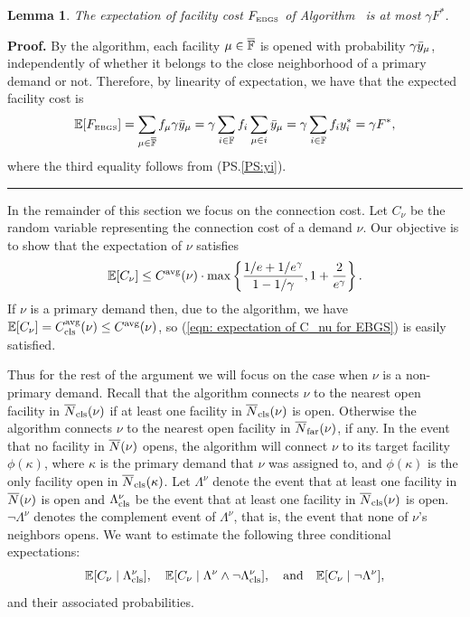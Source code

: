 \documentclass[oneside,final]{ucr}
\newtheorem{lemma}[theorem]{Lemma}
\newenvironment{proof}[1][Proof]{\textbf{#1.} }{\ \rule{0.5em}{0.5em}}
\begin{document}
\begin{lemma} \label{lem: EBGS facility cost}
The expectation of facility cost $F_{\mbox{\tiny\rm EBGS}}$ of Algorithm~{\EBGS} is at most $\gamma F^\ast$.
\end{lemma}
\begin{proof}
By the algorithm, each facility $\mu\in \overline{\mathbb{F}}$ is opened with
probability $\gamma {\bar y}_{\mu}$, independently of whether it belongs to the
close neighborhood of a primary demand or not. Therefore, by
  linearity of expectation, we have that the expected facility cost is
%
\begin{equation*}
	\mathbb{E}[F_{\mbox{\tiny\rm EBGS}}] = \sum_{\mu \in \overline{\mathbb{F}}} f_\mu \gamma {\bar y}_{\mu} 
			= \gamma \sum_{i\in \mathbb{F}} f_i \sum_{\mu\in i} {\bar y}_{\mu} 
			= \gamma \sum_{i \in \mathbb{F}} f_i y_i^\ast = \gamma F^\ast,
\end{equation*}
%
where the third equality follows from (PS.\ref{PS:yi}).
\end{proof}


\medskip

In the remainder of this section we focus on the connection cost. Let $C_{\nu}$ be the
random variable representing the connection cost of a demand $\nu$. Our objective is
to show that the expectation of $\nu$ satisfies
%
\begin{equation}
\mathbb{E}[C_\nu]	\leq C^{{\mbox{\scriptsize\rm avg}}}(\nu) \cdot \max\left\{\frac{1/e+1/e^\gamma}{1-1/\gamma}, 1 + \frac{2}{e^\gamma}\right\}.
		\label{eqn: expectation of C_nu for EBGS}
\end{equation}
%
If $\nu$ is a primary demand then, due to the algorithm, we have $\mathbb{E}[C_{\nu}] =
C_{{\mbox{\scriptsize\rm cls}}}^{{\mbox{\scriptsize\rm avg}}}(\nu) \le C^{{\mbox{\scriptsize\rm avg}}}(\nu)$, so (\ref{eqn: expectation of C_nu for EBGS}) is
easily satisfied.

Thus for the rest of the argument we will focus on the case when $\nu$
is a non-primary demand.  Recall that the
algorithm connects $\nu$ to the nearest open facility in
${\overline{N}}_{{\mbox{\scriptsize\rm cls}}}(\nu)$ if at least one facility in ${\overline{N}}_{{\mbox{\scriptsize\rm cls}}}(\nu)$ is
open. Otherwise the algorithm connects $\nu$ to the nearest open
facility in ${\overline{N}}_{{\mbox{\scriptsize\rm far}}}(\nu)$, if any. In the event that no facility in
${\overline{N}}(\nu)$ opens, the algorithm will connect $\nu$ to its target
facility $\phi(\kappa)$, where $\kappa$ is the primary demand that
$\nu$ was assigned to, and $\phi(\kappa)$ is the only facility open in
${\overline{N}}_{{\mbox{\scriptsize\rm cls}}}(\kappa)$. Let $\Lambda^\nu$ denote the event that at least
one facility in ${\overline{N}}(\nu)$ is open and $\Lambda^\nu_{{\mbox{\scriptsize\rm cls}}}$ be the
event that at least one facility in ${\overline{N}}_{{\mbox{\scriptsize\rm cls}}}(\nu)$ is open.
$\neg \Lambda^\nu$ denotes the complement event of $\Lambda^\nu$, that is,
the event that none of $\nu$'s neighbors opens. 
We want to estimate the following three conditional expectations: 
%
\begin{equation*}
  \mathbb{E}[C_{\nu} \mid
  \Lambda^\nu_{{\mbox{\scriptsize\rm cls}}}],\quad \mathbb{E}[C_{\nu} \mid \Lambda^\nu \wedge \neg
  \Lambda^\nu_{{\mbox{\scriptsize\rm cls}}}], \quad\text{and}\quad \mathbb{E}[C_{\nu} \mid \neg \Lambda^\nu], 
\end{equation*}
%
and their associated probabilities.
\end{document}
